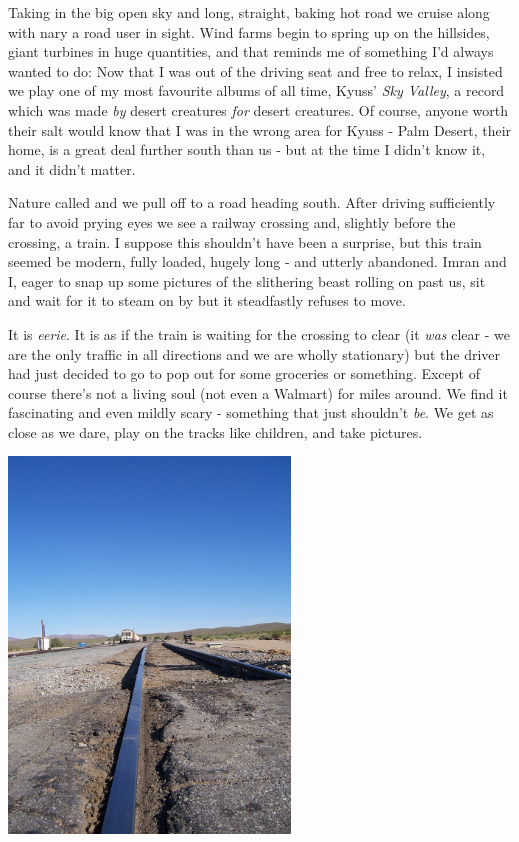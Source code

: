 \documentclass[a5paper,titlepage,11pt]{book}
\begin{document}
Taking in the big open sky and long, straight, baking hot road we cruise along with nary a road user in sight. Wind farms begin to spring up on the hillsides, giant turbines in huge quantities, and that reminds me of something I'd always wanted to do:  Now that I was out of the driving seat and free to relax, I insisted we play one of my most favourite albums of all time, Kyuss' \emph{Sky Valley}, a record which was made \emph{by} desert creatures \emph{for} desert creatures. Of course, anyone worth their salt would know that I was in the wrong area for Kyuss - Palm Desert, their home, is a great deal further south than us - but at the time I didn't know it, and it didn't matter.

Nature called and we pull off to a road heading south. After driving sufficiently far to avoid prying eyes we see a railway crossing and, slightly before the crossing, a train. I suppose this shouldn't have been a surprise, but this train seemed be modern, fully loaded, hugely long - and utterly abandoned. Imran and I, eager to snap up some pictures of the slithering beast rolling on past us, sit and wait for it to steam on by but it steadfastly refuses to move.

It is \emph{eerie}. It is as if the train is waiting for the crossing to clear (it \emph{was} clear - we are the only traffic in all directions and we are wholly stationary) but the driver had just decided to go to pop out for some groceries or something. Except of course there's not a living soul (not even a Walmart) for miles around. We find it fascinating and even mildly scary - something that just shouldn't \emph{be}. We get as close as we dare, play on the tracks like children, and take pictures.

\begin{center}\includegraphics[height=100mm]{gfx/100_1346}\end{center}
\end{document}
